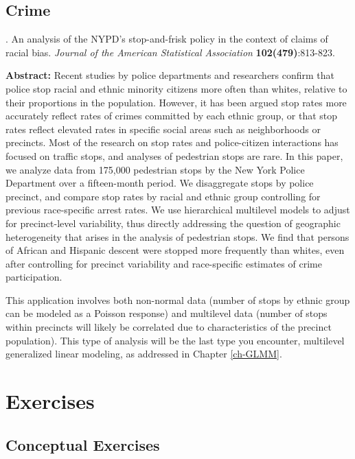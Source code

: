 \documentclass[
]{krantz}
\renewenvironment{quote}{\begin{VF}}{\end{VF}}
\begin{document}
\hypertarget{crime}{%
\subsection{Crime}\label{crime}}

\citet{Gelman2007} . An analysis of the NYPD's stop-and-frisk policy in the context of claims of racial bias. \emph{Journal of the American Statistical Association} \textbf{102(479)}:813-823.

\begin{quote}
\textbf{Abstract:} Recent studies by police departments and researchers confirm that police stop racial and ethnic minority citizens more often than whites, relative to their proportions in the population. However, it has been argued stop rates more accurately reflect rates of crimes committed by each ethnic group, or that stop rates reflect elevated rates in specific social areas such as neighborhoods or precincts. Most of the research on stop rates and police-citizen interactions has focused on traffic stops, and analyses of pedestrian stops are rare. In this paper, we analyze data from 175,000 pedestrian stops by the New York Police Department over a fifteen-month period. We disaggregate stops by police precinct, and compare stop rates by racial and ethnic group controlling for previous race-specific arrest rates. We use hierarchical multilevel models to adjust for precinct-level variability, thus directly addressing the question of geographic heterogeneity that arises in the analysis of pedestrian stops. We find that persons of African and Hispanic descent were stopped more frequently than whites, even after controlling for precinct variability and race-specific estimates of crime participation.
\end{quote}

This application involves both non-normal data (number of stops by ethnic group can be modeled as a Poisson response) and multilevel data (number of stops within precincts will likely be correlated due to characteristics of the precinct population). This type of analysis will be the last type you encounter, multilevel generalized linear modeling, as addressed in Chapter \ref{ch-GLMM}.

\hypertarget{exercises}{%
\section{Exercises}\label{exercises}}

\hypertarget{conceptual-exercises}{%
\subsection{Conceptual Exercises}\label{conceptual-exercises}}
\end{document}
